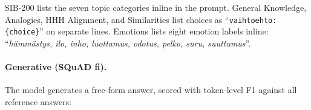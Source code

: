 \documentclass[11pt]{article}
\begin{document}
SIB-200 lists the seven topic categories inline in the prompt.
General Knowledge, Analogies, HHH Alignment, and Similarities list
choices as ``\texttt{vaihtoehto: \{choice\}}'' on separate lines.
Emotions lists eight emotion labels inline:
``\textit{hämmästys, ilo, inho, luottamus, odotus, pelko, suru, suuttumus}''.

\paragraph{Generative (SQuAD fi).}
The model generates a free-form answer, scored with token-level F1
against all reference answers:

\vspace{4pt}
{\setlength{\fboxrule}{0.4pt}\setlength{\fboxsep}{6pt}%
\noindent{}}
\vspace{4pt}
\end{document}
